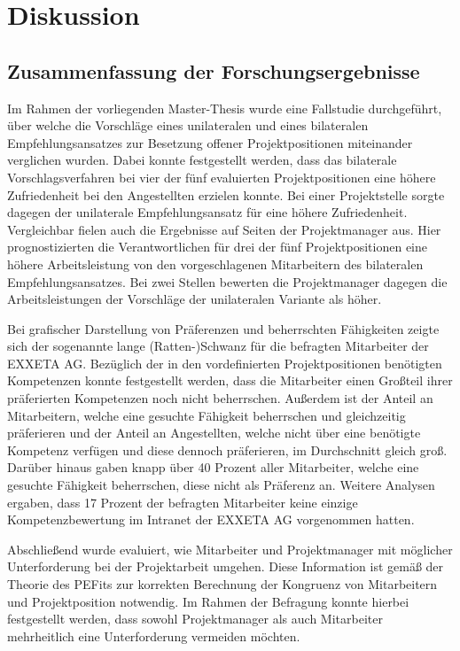 \chapter{Diskussion}
\label{ch:diskussion}

\section{Zusammenfassung der Forschungsergebnisse}
\label{ch:diskussion:zusammenfassung}
Im Rahmen der vorliegenden Master-Thesis wurde eine Fallstudie durchgeführt, über welche die Vorschläge eines unilateralen und eines bilateralen Empfehlungsansatzes zur Besetzung offener Projektpositionen miteinander verglichen wurden. Dabei konnte festgestellt werden, dass das bilaterale Vorschlagsverfahren bei vier der fünf evaluierten Projektpositionen eine höhere Zufriedenheit bei den Angestellten erzielen konnte. Bei einer Projektstelle sorgte dagegen der unilaterale Empfehlungsansatz für eine höhere Zufriedenheit. Vergleichbar fielen auch die Ergebnisse auf Seiten der Projektmanager aus. Hier prognostizierten die Verantwortlichen für drei der fünf Projektpositionen eine höhere Arbeitsleistung von den vorgeschlagenen Mitarbeitern des bilateralen Empfehlungsansatzes. Bei zwei Stellen bewerten die Projektmanager dagegen die Arbeitsleistungen der Vorschläge der unilateralen Variante als höher.

Bei grafischer Darstellung von Präferenzen und beherrschten Fähigkeiten zeigte sich der sogenannte lange (Ratten-)Schwanz für die befragten Mitarbeiter der EXXETA AG. Bezüglich der in den vordefinierten Projektpositionen benötigten Kompetenzen konnte festgestellt werden, dass die Mitarbeiter einen Großteil ihrer präferierten Kompetenzen noch nicht beherrschen. Außerdem ist der Anteil an Mitarbeitern, welche eine gesuchte Fähigkeit beherrschen und gleichzeitig präferieren und der Anteil an Angestellten, welche nicht über eine benötigte Kompetenz verfügen und diese dennoch präferieren, im Durchschnitt gleich groß. Darüber hinaus gaben knapp über 40 Prozent aller Mitarbeiter, welche eine gesuchte Fähigkeit beherrschen, diese nicht als Präferenz an. Weitere Analysen ergaben, dass 17 Prozent der befragten Mitarbeiter keine einzige Kompetenzbewertung im Intranet der EXXETA AG vorgenommen hatten.

Abschließend wurde evaluiert, wie Mitarbeiter und Projektmanager mit möglicher Unterforderung bei der Projektarbeit umgehen. Diese Information ist gemäß der Theorie des \acp{PEFit} zur korrekten Berechnung der Kongruenz von Mitarbeitern und Projektposition notwendig. Im Rahmen der Befragung konnte hierbei festgestellt werden, dass sowohl Projektmanager als auch Mitarbeiter mehrheitlich eine Unterforderung vermeiden möchten.

